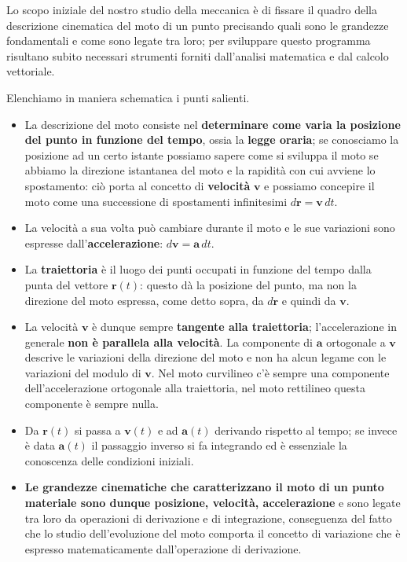 \documentclass[12pt]{article}
\begin{document}
Lo scopo iniziale del nostro studio della meccanica è di fissare il quadro della descrizione cinematica del moto di un punto precisando quali sono le grandezze fondamentali e come sono legate tra loro; per sviluppare questo programma risultano subito necessari strumenti forniti dall'analisi matematica e dal calcolo vettoriale.

Elenchiamo in maniera schematica i punti salienti.

\begin{itemize}
    \item La descrizione del moto consiste nel \textbf{determinare come varia la posizione del punto in funzione del tempo}, ossia la \textbf{legge oraria}; se conosciamo la posizione ad un certo istante possiamo sapere come si sviluppa il moto se abbiamo la direzione istantanea del moto e la rapidità con cui avviene lo spostamento: ciò porta al concetto di \textbf{velocità} $\mathbf{v}$ e possiamo concepire il moto come una successione di spostamenti infinitesimi $d\mathbf{r} = \mathbf{v} \, dt$.
    
    \item La velocità a sua volta può cambiare durante il moto e le sue variazioni sono espresse dall'\textbf{accelerazione}: $d\mathbf{v} = \mathbf{a} \, dt$.
    
    \item La \textbf{traiettoria} è il luogo dei punti occupati in funzione del tempo dalla punta del vettore $\mathbf{r}(t)$: questo dà la posizione del punto, ma non la direzione del moto espressa, come detto sopra, da $d\mathbf{r}$ e quindi da $\mathbf{v}$.
    
    \item La velocità $\mathbf{v}$ è dunque sempre \textbf{tangente alla traiettoria}; l'accelerazione in generale \textbf{non è parallela alla velocità}. La componente di $\mathbf{a}$ ortogonale a $\mathbf{v}$ descrive le variazioni della direzione del moto e non ha alcun legame con le variazioni del modulo di $\mathbf{v}$. Nel moto curvilineo c'è sempre una componente dell'accelerazione ortogonale alla traiettoria, nel moto rettilineo questa componente è sempre nulla.
    
    \item Da $\mathbf{r}(t)$ si passa a $\mathbf{v}(t)$ e ad $\mathbf{a}(t)$ derivando rispetto al tempo; se invece è data $\mathbf{a}(t)$ il passaggio inverso si fa integrando ed è essenziale la conoscenza delle condizioni iniziali.
    
    \item \textbf{Le grandezze cinematiche che caratterizzano il moto di un punto materiale sono dunque posizione, velocità, accelerazione} e sono legate tra loro da operazioni di derivazione e di integrazione, conseguenza del fatto che lo studio dell'evoluzione del moto comporta il concetto di variazione che è espresso matematicamente dall'operazione di derivazione.
    

\end{itemize}
\end{document}
